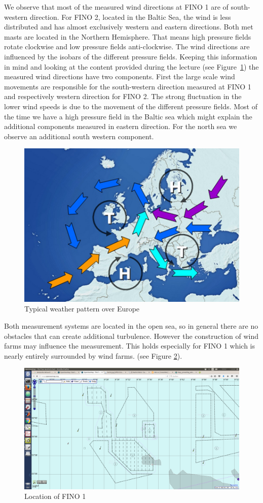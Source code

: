 \documentclass[10pt]{article}
\begin{document}
We observe that most of the measured wind directions at FINO 1 are of south-western direction. For FINO 2, located in the Baltic Sea, the wind is less distributed and has almost exclusively western and eastern directions. Both met masts are located in the Northern Hemisphere. That means high pressure fields rotate clockwise and low pressure fields anti-clockwise. The wind directions are influenced by the isobars of the different pressure fields. Keeping this information in mind and looking at the content provided during the lecture (see Figure~\ref{fig:weatherpattern}) the measured wind directions have two components. First the large scale wind movements are responsible for the south-western direction measured at FINO 1 and respectively western direction for FINO 2. The strong fluctuation in the lower wind speeds is due to the movement of the different pressure fields. Most of the time we have a high pressure field in the Baltic sea which might explain the additional components measured in eastern direction. For the north sea we observe an additional south western component.\\

\begin{figure}[H]
\centering
\includegraphics[width=0.5\linewidth]{../figures/warm_air_advection.png}
\caption{Typical weather pattern over Europe}
\label{fig:weatherpattern}
\end{figure}

Both measurement systems are located in the open sea, so in general there are no obstacles that can create additional turbulence. However the construction of wind farms may influence the measurement. This holds especially for FINO 1 which is nearly entirely surrounded by wind farms. (see Figure \ref{fig:fino1}).\\

\begin{figure}[H]
\centering
\includegraphics[width=0.5\linewidth]{../figures/fino1.png}
\caption{Location of FINO 1}
\label{fig:fino1}
\end{figure} 
 
\end{document}
